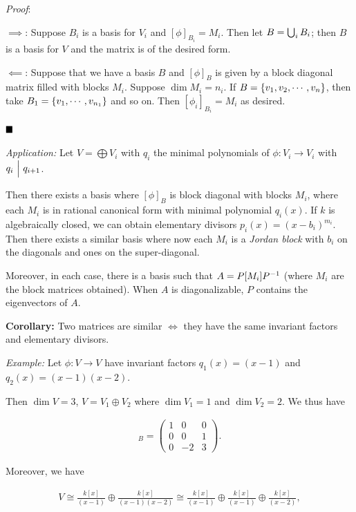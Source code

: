 \emph{Proof}:

\(\implies\): Suppose \(B_i\) is a basis for \(V_i\) and
\([\phi]_{B_i} = M_i\). Then let \(B = \bigcup_i B_i\); then \(B\) is a
basis for \(V\) and the matrix is of the desired form.

\(\impliedby\): Suppose that we have a basis \(B\) and \([\phi]_B\) is
given by a block diagonal matrix filled with blocks \(M_i\). Suppose
\(\dim M_i = n_i\). If \(B = \left\{{v_1, v_2, \cdots, v_n}\right\}\), then take
\(B_1 = \left\{{v_1, \cdots, v_{n_1}}\right\}\) and so on. Then
\([\phi_i]_{B_i} = M_i\) as desired.

\(\qed\)

\emph{Application:} Let \(V = \bigoplus V_i\) with \(q_i\) the minimal
polynomials of \(\phi: V_i \to V_i\) with \(q_i {~\Bigm| ~} q_{i+1}\).

Then there exists a basis where \([\phi]_B\) is block diagonal with
blocks \(M_i\), where each \(M_i\) is in rational canonical form with
minimal polynomial \(q_i(x)\). If \(k\) is algebraically closed, we can
obtain elementary divisors \(p_i(x) = (x - b_i)^{m_i}\). Then there
exists a similar basis where now each \(M_i\) is a \emph{Jordan block}
with \(b_i\) on the diagonals and ones on the super-diagonal.

Moreover, in each case, there is a basis such that \(A = P [M_i] P^{-1}\)
(where \(M_i\) are the block matrices obtained). When \(A\) is
diagonalizable, \(P\) contains the eigenvectors of \(A\).

\textbf{Corollary:} Two matrices are similar \(\iff\) they have the same
invariant factors and elementary divisors.

\emph{Example:} Let \(\phi: V\to V\) have invariant factors
\(q_1(x) = (x-1)\) and \(q_2(x) = (x-1)(x-2)\).

Then \(\dim V = 3\), \(V = V_1 \oplus V_2\) where \(\dim V_1 = 1\) and
\(\dim V_2 = 2\). We thus have

\begin{align*}
[\phi]_B =
\left(\begin{array}{ccc}
1 & 0 & 0 \\
0 & 0 & 1 \\
0 & -2 & 3
\end{array}\right)
.\end{align*}

Moreover, we have

\begin{align*}
V
\cong \frac{k[x]}{(x-1)} \oplus \frac{k[x]}{(x-1)(x-2)}
\cong \frac{k[x]}{(x-1)} \oplus \frac{k[x]}{(x-1)} \oplus \frac{k[x]}{(x-2)}
,\end{align*}

